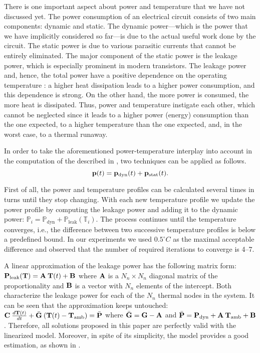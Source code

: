 There is one important aspect about power and temperature that we have not
discussed yet. The power consumption of an electrical circuit consists of two
main components: dynamic and static. The dynamic power---which is the power that
we have implicitly considered so far---is due to the actual useful work done by
the circuit. The static power is due to various parasitic currents that cannot
be entirely eliminated. The major component of the static power is the leakage
power, which is especially prominent in modern  transistors. The
leakage power and, hence, the total power have a positive dependence on the
operating temperature \cite{liu2007}: a higher heat dissipation leads to a
higher power consumption, and this dependence is strong. On the other hand, the
more power is consumed, the more heat is dissipated. Thus, power and temperature
instigate each other, which cannot be neglected since it leads to a higher power
(energy) consumption than the one expected, to a higher temperature than the one
expected, and, in the worst case, to a thermal runaway.

In order to take the aforementioned power-temperature interplay into account in
the computation of the  described in
, two techniques can be applied as follows.
\[
  \mathbf{p}(t) = \mathbf{p}_{\mathrm{dyn}}(t) + \mathbf{p}_{\mathrm{stat}}(t).
\]

First of all, the power and temperature profiles can be calculated several times
in turns until they stop changing. With each new temperature profile we update
the power profile by computing the leakage power and adding it to the dynamic
power: $\mathbb{P}_i = \mathbb{P}_\text{dyn} +
\mathbb{P}_\text{leak}(\mathbb{T}_i)$. The process continues until the
temperature converges, i.e., the difference between two successive temperature
profiles is below a predefined bound. In our experiments we used $0.5^\circ C$
as the maximal acceptable difference and observed that the number of required
iterations to converge is 4--7.

A linear approximation of the leakage power has the following matrix form:
$\mathbf{P}_\text{leak}(\mathbf{T}) = \mathbf{A} \: \mathbf{T}(t) + \mathbf{B}$ where $\mathbf{A}$ is a $N_n
\times N_n$ diagonal matrix of the proportionality and $\mathbf{B}$ is a vector with
$N_n$ elements of the intercept. Both characterize the leakage power for each of
the $N_n$ thermal nodes in the system. It can be seen that the approximation
keeps  untouched: $\mathbf{C} \:
\frac{d\mathbf{T}(t)}{dt} + \bar{\mathbf{G}} \: (\mathbf{T}(t) - \mathbf{T}_{\mathrm{amb}}) = \bar{\mathbf{P}}$
where $\bar{\mathbf{G}} = \mathbf{G} - \mathbf{A}$ and $\bar{\mathbf{P}} = \mathbf{P}_\text{dyn} + \mathbf{A}
\: \mathbf{T}_{\mathrm{amb}} + \mathbf{B}$. Therefore, all solutions proposed in this paper are
perfectly valid with the linearized model. Moreover, in spite of its simplicity,
the model provides a good estimation, as shown in \cite{liu2007}.

